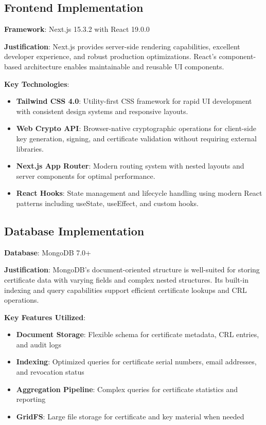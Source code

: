 \subsection{Frontend Implementation}

\textbf{Framework}: Next.js 15.3.2 with React 19.0.0

\textbf{Justification}: Next.js provides server-side rendering capabilities, excellent developer experience, and robust production optimizations. React's component-based architecture enables maintainable and reusable UI components.

\textbf{Key Technologies}:

\begin{itemize}
    \item \textbf{Tailwind CSS 4.0}: Utility-first CSS framework for rapid UI development with consistent design systems and responsive layouts.
    
    \item \textbf{Web Crypto API}: Browser-native cryptographic operations for client-side key generation, signing, and certificate validation without requiring external libraries.
    
    \item \textbf{Next.js App Router}: Modern routing system with nested layouts and server components for optimal performance.
    
    \item \textbf{React Hooks}: State management and lifecycle handling using modern React patterns including useState, useEffect, and custom hooks.
\end{itemize}

\subsection{Database Implementation}

\textbf{Database}: MongoDB 7.0+

\textbf{Justification}: MongoDB's document-oriented structure is well-suited for storing certificate data with varying fields and complex nested structures. Its built-in indexing and query capabilities support efficient certificate lookups and CRL operations.

\textbf{Key Features Utilized}:

\begin{itemize}
    \item \textbf{Document Storage}: Flexible schema for certificate metadata, CRL entries, and audit logs
    \item \textbf{Indexing}: Optimized queries for certificate serial numbers, email addresses, and revocation status
    \item \textbf{Aggregation Pipeline}: Complex queries for certificate statistics and reporting
    \item \textbf{GridFS}: Large file storage for certificate and key material when needed
\end{itemize}

